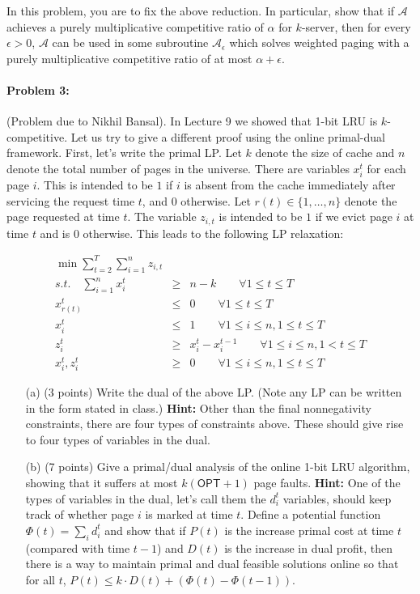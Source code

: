 \documentclass[12pt]{article}
\begin{document}
In this problem, you are to fix the above reduction. In particular, show that if $\mathcal{A}$ achieves a purely multiplicative competitive ratio of $\alpha$ for $k$-server, then for every $\epsilon>0$, $\mathcal{A}$ can be used in some subroutine $\mathcal{A}_\epsilon$ which solves weighted paging with a purely multiplicative competitive ratio of at most $\alpha + \epsilon$.

\paragraph{Problem 3:} (Problem due to Nikhil Bansal). In Lecture 9 we showed that 1-bit LRU is $k$-competitive. Let us try to give a different proof using the online primal-dual framework. First, let's write the primal LP. Let $k$ denote the size of cache and $n$ denote the total number of pages in the universe. There are variables $x^t_i$ for each page $i$. This is intended to be $1$ if $i$ is absent from the cache immediately after servicing the request time $t$, and $0$ otherwise.  Let $r(t)\in\{1,\ldots,n\}$ denote the page requested at time $t$. The variable $z_{i,t}$ is intended to be $1$ if we evict page $i$ at time $t$ and is $0$ otherwise. This leads to the following LP relaxation:

\begin{eqnarray*}
\min \sum_{t=2}^T \sum_{i=1}^n  z_{i,t} & &  \\
s.t. \quad \sum_{i=1}^n  x^t_i & \geq & n-k \qquad \forall 1\le t\le T\\
 x^t_{r(t)}  & \leq & 0  \qquad \forall 1\le t\le T \\
 x^{t}_i & \leq &  1 \qquad \forall 1\le i\le n, 1\le t\le T \\
 z^t_{i} & \geq &  x^t_i - x^{t-1}_i  \qquad \forall 1\le i\le n, 1< t\le T \\ 
x^t_i, z^{t}_i & \geq & 0 \qquad \forall 1\le i\le n, 1\le t\le T
\end{eqnarray*}

\begin{itemize}
\item[(a)] (3 points) Write the dual of the above LP. (Note any LP can be written in the form stated in class.) \textbf{Hint:} Other than the final nonnegativity constraints, there are four types of constraints above. These should give rise to four types of variables in the dual.
\item[(b)] (7 points) Give a primal/dual analysis of the online 1-bit LRU algorithm, showing that it suffers at most $k(\textsf{OPT} + 1)$ page faults. \textbf{Hint:} One of the types of variables in the dual, let's call them the $d_i^t$ variables, should keep track of whether page $i$ is marked at time $t$. Define a potential function $\Phi(t) = \sum_i d_i^t$ and show that if $P(t)$ is the increase primal cost at time $t$ (compared with time $t-1$) and $D(t)$ is the increase in dual profit, then there is a way to maintain primal and dual feasible solutions online so that for all $t$, $P(t) \le k\cdot D(t) + (\Phi(t) - \Phi(t-1))$.
\end{itemize}
\end{document}
